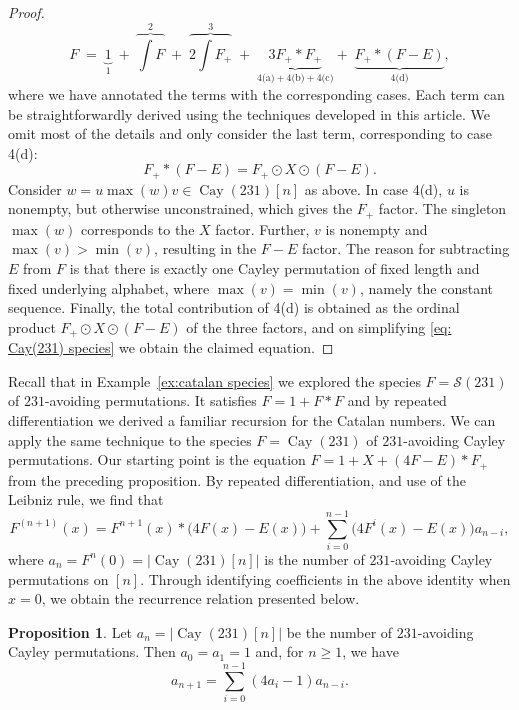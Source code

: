 \documentclass[a4paper, 11pt]{article}
\DeclareMathOperator{\Cay}{Cay}
\newcommand{\Sym}{\mathcal{S}}
\theoremstyle{definition}
\newtheorem{proposition}[theorem]{Proposition}
\begin{document}
\begin{proof}
\begin{equation}\label{eq: Cay(231) species}
F \;=\;
\underbrace{1}_1\;+\;
\overbrace{\int F}^2\;+\;
\overbrace{2\int F_+}^3\;+\;
\!\!\underbrace{3F_+*F_+}_{4\text{(a)}+4\text{(b)}+4\text{(c)}}\!\!+\;
\underbrace{F_+*(F-E)}_{4\text{(d)}},
\end{equation}
where we have annotated the terms with the corresponding cases.  Each
term can be straightforwardly derived using the techniques developed in this
article.  We omit most of the details and only consider the last
term, corresponding to case 4(d):
\[
  F_+*(F-E) = F_+\odot X\odot (F-E).
\]
Consider $w = u \max(w) v\in \Cay(231)[n]$ as above. In case 4(d), $u$
is nonempty, but otherwise unconstrained, which gives the $F_+$
factor. The singleton $\max(w)$ corresponds to the $X$ factor.  Further,
$v$ is nonempty and $\max(v)>\min(v)$, resulting in the $F-E$ factor. The reason for
subtracting $E$ from $F$ is that there is exactly one Cayley permutation
of fixed length and fixed underlying alphabet, where $\max(v)=\min(v)$,
namely the constant sequence. Finally, the total contribution
of 4(d) is obtained as the ordinal product $F_+\odot X\odot (F-E)$ of
the three factors, and on simplifying \eqref{eq: Cay(231) species} we obtain
the claimed equation.
\end{proof}

Recall that in Example~\ref{ex:catalan species} we explored the species
$F=\Sym(231)$ of $231$-avoiding permutations. It satisfies $F = 1 + F*F$
and by repeated differentiation we derived a familiar recursion for the
Catalan numbers. We can apply the same technique to
the species $F=\Cay(231)$ of $231$-avoiding Cayley permutations. Our
starting point is the equation $F = 1 + X + (4F-E)*F_+$ from the
preceding proposition. By repeated differentiation, and use of the
Leibniz rule, we find that
\[
  F^{(n+1)}(x) =
  F^{n+1}(x)*\bigl(4F(x)-E(x)\bigr) + \sum_{i=0}^{n-1}\bigl(4F^{i}(x)-E(x)\bigr)a_{n-i},
\]
where $a_n=F^n(0)=|\Cay(231)[n]|$ is the number of $231$-avoiding Cayley
permutations on $[n]$. Through identifying coefficients in the above identity
when $x=0$, we obtain the recurrence relation presented below.

\begin{proposition}\label{prop: Cay(231) recurrence}
  Let $a_n=|\Cay(231)[n]|$ be the number of $231$-avoiding Cayley
  permutations. Then $a_0=a_1=1$ and, for $n\geq 1$, we have
  \[
    a_{n+1}= \sum_{i=0}^{n-1}(4a_i-1)a_{n-i}.
  \]
\end{proposition}
\end{document}
